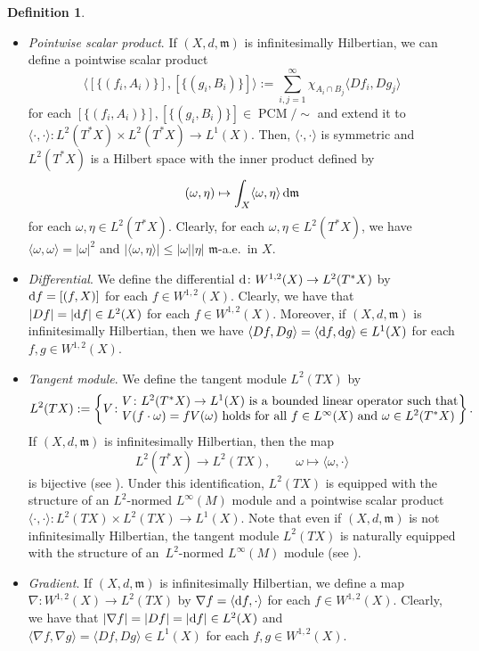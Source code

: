 \documentclass[pdftex]{sigma}
\numberwithin{equation}{section}
\theoremstyle{definition}
\newtheorem{Def}[Thm]{Definition}
\newcommand{\PCM}{\operatorname{PCM}}
\newcommand{\mf}{\mathfrak{m}}
\begin{document}
\begin{Def}
\begin{itemize}
In general, $L^2(T^\ast X)$ does not need to be a Hilbert space, and $L^2(T^\ast X)$ is a Hilbert space if and only if $(X,d,\mf)$ is infinitesimally Hilbertian \cite[Proposition~2.3.17]{Gig}.
\item \emph{Pointwise scalar product}. If $(X,d,\mf)$ is infinitesimally Hilbertian, we can define a pointwise scalar product
\[
\langle[\{(f_i,A_i)\}],[\{(g_i,B_i)\}]\rangle:=\sum_{i,j=1}^\infty \chi_{A_i\cap B_j}\langle D f_i,D g_j\rangle
\]
for each $[\{(f_i,A_i)\}],[\{(g_i,B_i)\}]\in\PCM/{\sim}$ and extend it to $\langle\cdot,\cdot\rangle\colon L^2(T^\ast X)\times L^2(T^\ast X)\to L^1(X)$.
Then, $\langle\cdot,\cdot\rangle$ is symmetric and $L^2(T^\ast X)$ is a Hilbert space with the inner product defined by
\[
(\omega,\eta)\mapsto \int_X \langle\omega,\eta\rangle\,{\rm d}\mf
\]
for each $\omega,\eta\in L^2(T^\ast X)$.
Clearly, for each $\omega,\eta\in L^2(T^\ast X)$, we have $\langle \omega,\omega\rangle=|\omega|^2$ and $|\langle\omega,\eta\rangle|\leq |\omega||\eta|$ $\mf$-a.e.\ in $X$.
\item \emph{Differential}. We define the differential ${\rm d}\colon W^{1,2}(X)\to L^2(T^\ast X)$ by ${\rm d} f=[(f,X)]$ for each $f\in W^{1,2}(X)$. Clearly, we have that $|D f|=|{\rm d} f|\in L^2(X)$ for each $f\in W^{1,2}(X)$.
Moreover, if $(X,d,\mf)$ is infinitesimally Hilbertian, then we have $\langle D f,D g\rangle=\langle {\rm d} f , {\rm d} g\rangle\in L^1(X)$ for each $f,g\in W^{1,2}(X)$.
\item \emph{Tangent module}. We define the tangent module $L^2(T X)$ by
\[
L^2(T X):=\left\{V\colon \begin{array}{@{}l@{}}\text{$V\colon L^2(T^\ast X)\to L^1(X)$ is a bounded linear operator such that}\\
\text{$V(f\cdot \omega)=f V(\omega)$ holds for all $f\in L^\infty(X)$ and $\omega\in L^2(T^\ast X)$}
\end{array} \right\} .
\]
If $(X,d,\mf)$ is infinitesimally Hilbertian, then the map
\[
L^2(T^\ast X)\to L^2(T X),\qquad\omega\mapsto \langle\omega,\cdot\rangle
\]
is bijective (see \cite[Theorem~1.2.24]{Gig}).
Under this identification, $L^2(T X)$ is equipped with the structure of an $L^2$-normed $L^\infty(M)$ module and a pointwise scalar product $\langle\cdot,\cdot\rangle\colon L^2(T X)\times L^2(T X)\to L^1(X)$.
Note that even if $(X,d,\mf)$ is not infinitesimally Hilbertian, the tangent module $L^2(T X)$ is naturally equipped with the structure of an~$L^2$-normed $L^\infty(M)$ module (see \cite[Definition~1.2.6 and~Proposition~1.2.14]{Gig}).
\item \emph{Gradient}. If $(X,d,\mf)$ is infinitesimally Hilbertian, we define a map $\nabla\colon W^{1,2}(X)\to L^2(T X)$ by $\nabla f=\langle {\rm d} f,\cdot\rangle$ for each $f\in W^{1,2}(X)$. Clearly, we have that $|\nabla f|=|D f|=|{\rm d} f|\in L^2(X)$ and $\langle\nabla f,\nabla g\rangle=\langle D f, D g\rangle\in L^1(X)$ for each $f,g \in W^{1,2}(X)$.

\end{itemize}
\end{Def}
\end{document}

